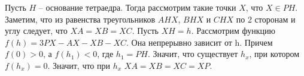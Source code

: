 Пусть $H$ -- основание тетраедра. Тогда рассмотрим такие точки $X$, что $X\in PH$. Заметим, что из равенства треугольников $AHX$, $BHX$ и $CHX$ по 2 сторонам и углу следует, что $XA = XB = XC$. Пусть $XH=h$. Рассмотрим функцию $f(h)=3PX-AX-XB-XC$. Она непрерывно зависит от h. Причем $f(0)>0$, а $f(h_1)<0$, где $h_1=PH$. Значит, что существует $h_x$, при котором $f(h_x)=0$. Значит, что при $h_x$ $XA = XB = XC = XP$.